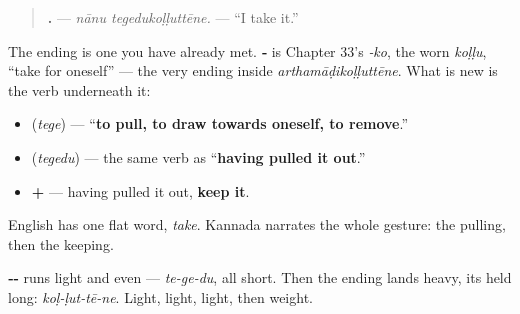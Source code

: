 \begin{quote}
\textbf{ .} — \emph{nānu tegedukoḷḷuttēne.} — \textquotedblleft{}I take it.\textquotedblright{}
\end{quote}

The ending is one you have already met. \textbf{‑} is Chapter 33's \emph{‑ko}, the worn \emph{koḷḷu}, \textquotedblleft{}take for oneself\textquotedblright{} — the very ending inside \emph{arthamāḍikoḷḷuttēne}. What is new is the verb underneath it:

\begin{itemize}
\raggedright
  \item \textbf{} (\emph{tege}) — \textquotedblleft{}\textbf{to pull, to draw towards oneself, to remove}.\textquotedblright{}
  \item \textbf{} (\emph{tegedu}) — the same verb as \textquotedblleft{}\textbf{having pulled it out}.\textquotedblright{}
  \item \textbf{ + } — having pulled it out, \textbf{keep it}.
\end{itemize}

English has one flat word, \emph{take}. Kannada narrates the whole gesture: the pulling, then the keeping.

\begin{sounds}
\textbf{‑‑} runs light and even — \emph{te-ge-du}, all short. Then the ending lands heavy, its \textbf{} held long: \emph{koḷ-ḷut-tē-ne}. Light, light, light, then weight.
\end{sounds}

